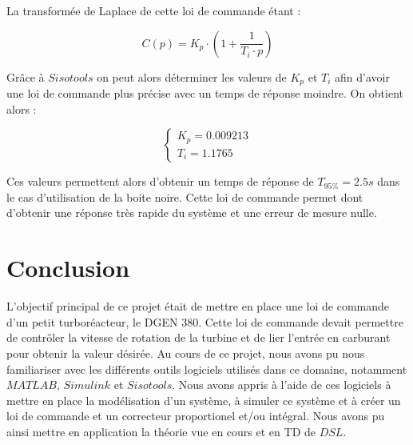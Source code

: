 \documentclass[12pt]{report}
\begin{document}
La transformée de Laplace de cette loi de commande étant :

\vspace{0.2cm}
\begin{equation}
  C(p) = K_p \cdot \left( 1 + \frac{1}{T_i \cdot p} \right)
\end{equation}

Grâce à $Sisotools$ on peut alors déterminer les valeurs de $K_p$ et $T_i$ afin d'avoir
une loi de commande plus précise avec un temps de réponse moindre. On obtient alors :

\vspace{0.2cm}
\begin{equation}
  \left\{
  \begin{matrix}
  K_p = 0.009213 \\
  T_i = 1.1765
  \end{matrix}
  \right.
\end{equation}

Ces valeurs permettent alors d'obtenir un temps de réponse de $T_{95\%} = 2.5s$ dans
le cas d'utilisation de la boite noire. Cette loi de commande permet dont d'obtenir 
une réponse très rapide du système et une erreur de mesure nulle.

\newpage

\chapter{Conclusion}

L'objectif principal de ce projet était de mettre en place une loi de commande
d'un petit turboréacteur, le DGEN 380. Cette loi de commande devait permettre de
contrôler la vitesse de rotation de la turbine et de lier l'entrée en carburant
pour obtenir la valeur désirée. Au cours de ce projet, nous avons pu nous familiariser
avec les différents outils logiciels utilisés dans ce domaine, notamment $MATLAB$,
$Simulink$ et $Sisotools$. Nous avons appris à l'aide de ces logiciels à mettre 
en place la modélisation d'un système, à simuler ce système et à créer un loi de
commande et un correcteur proportionel et/ou intégral. Nous avons pu ainsi mettre
en application la théorie vue en cours et en TD de $DSL$.
\end{document}
